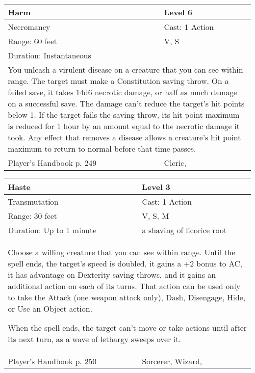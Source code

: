 \documentclass[11pt]{report}
\begin{document}
\begin{table}[H]
	\begin{tabular}{||p{6cm}|p{6cm}||}
		\hline\hline
		\bf{Harm} & Level 6\\ \hline
		Necromancy & Cast: 1 Action\\ \hline
		Range: 60 feet & V, S\\ \hline
		Duration: Instantaneous & \\ \hline
		\multicolumn{2}{||p{12cm}||}{You unleash a virulent disease on a creature that you can see within range.
The target must make a Constitution saving throw. On a failed save, it takes 14d6 necrotic damage, or half as much damage on a successful save. The damage can’t reduce the target’s hit points below 1. If the target fails the saving throw, its hit point maximum is reduced for 1 hour by an amount equal to the necrotic damage it took. Any effect that removes a disease allows a creature’s hit point maximum to return to normal before that time passes.}\\ \hline
Player's Handbook p. 249 & Cleric, \\ \hline\hline
	\end{tabular}
\end{table}

\begin{table}[H]
	\begin{tabular}{||p{6cm}|p{6cm}||}
		\hline\hline
		\bf{Haste} & Level 3\\ \hline
		Transmutation & Cast: 1 Action\\ \hline
		Range: 30 feet & V, S, M\\ \hline
		Duration: Up to 1 minute & a shaving of licorice root\\ \hline
		\multicolumn{2}{||p{12cm}||}{Choose a willing creature that you can see within range. Until the spell ends, the target’s speed is doubled, it gains a +2 bonus to AC, it has advantage on Dexterity saving throws, and it gains an additional action on each of its turns. That action can be used only to take the Attack (one weapon attack only), Dash, Disengage, Hide, or Use an Object action.

When the spell ends, the target can’t move or take actions until after its next turn, as a wave of lethargy sweeps over it.}\\ \hline
Player's Handbook p. 250 & Sorcerer, Wizard, \\ \hline\hline
	\end{tabular}
\end{table}
\end{document}

